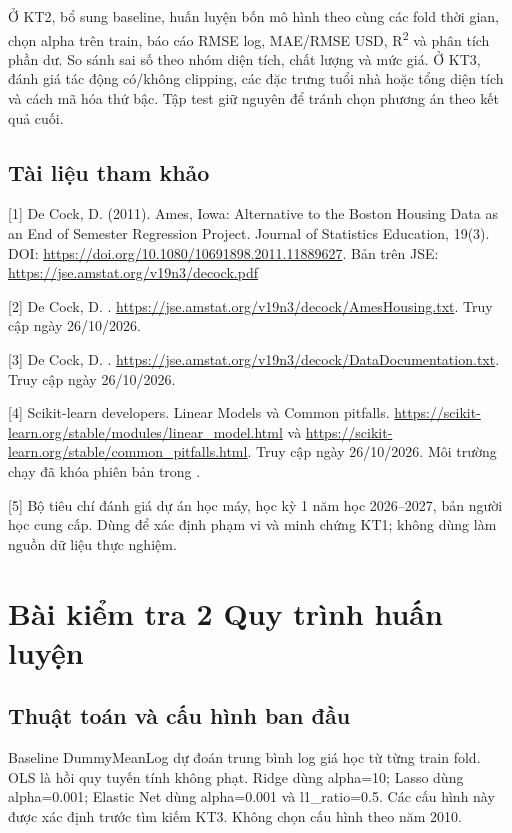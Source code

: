 \documentclass[12pt,a4paper]{article}
\begin{document}
Ở KT2, bổ sung baseline, huấn luyện bốn mô hình theo cùng các fold thời gian, chọn alpha trên train, báo cáo RMSE log, MAE/RMSE USD, R\textsuperscript{2} và phân tích phần dư. So sánh sai số theo nhóm diện tích, chất lượng và mức giá. Ở KT3, đánh giá tác động có/không clipping, các đặc trưng tuổi nhà hoặc tổng diện tích và cách mã hóa thứ bậc. Tập test giữ nguyên để tránh chọn phương án theo kết quả cuối.


\subsection*{Tài liệu tham khảo}

[1] De Cock, D. (2011). Ames, Iowa: Alternative to the Boston Housing Data as an End of Semester Regression Project. Journal of Statistics Education, 19(3). DOI: \url{https://doi.org/10.1080/10691898.2011.11889627}. Bản trên JSE: \url{https://jse.amstat.org/v19n3/decock.pdf}


[2] De Cock, D. . \url{https://jse.amstat.org/v19n3/decock/AmesHousing.txt}. Truy cập ngày 26/10/2026.


[3] De Cock, D. . \url{https://jse.amstat.org/v19n3/decock/DataDocumentation.txt}. Truy cập ngày 26/10/2026.


[4] Scikit-learn developers. Linear Models và Common pitfalls. \url{https://scikit-learn.org/stable/modules/linear_model.html} và \url{https://scikit-learn.org/stable/common_pitfalls.html}. Truy cập ngày 26/10/2026. Môi trường chạy đã khóa phiên bản trong .


[5] Bộ tiêu chí đánh giá dự án học máy, học kỳ 1 năm học 2026–2027, bản người học cung cấp. Dùng để xác định phạm vi và minh chứng KT1; không dùng làm nguồn dữ liệu thực nghiệm.




\clearpage\section{Bài kiểm tra 2 Quy trình huấn luyện}

\subsection{Thuật toán và cấu hình ban đầu}

Baseline DummyMeanLog dự đoán trung bình log giá học từ từng train fold. OLS là hồi quy tuyến tính không phạt. Ridge dùng alpha=10; Lasso dùng alpha=0.001; Elastic Net dùng alpha=0.001 và l1\_ratio=0.5. Các cấu hình này được xác định trước tìm kiếm KT3. Không chọn cấu hình theo năm 2010.
\end{document}

